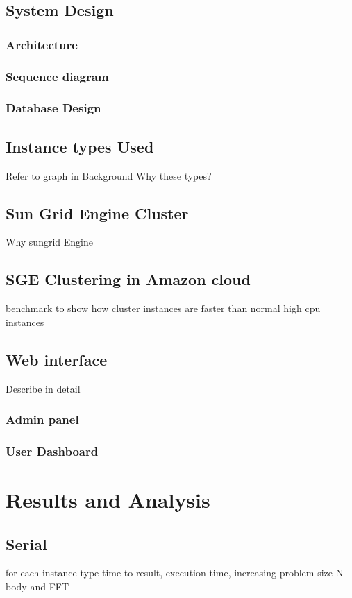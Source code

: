 \documentclass[12pt,a4paper]{report}
\begin{document}
\section{System Design}
\subsection{Architecture}
\subsection{Sequence diagram}
\subsection{Database Design}

\section{Instance types Used}
Refer to graph in Background
Why these types?
\section{Sun Grid Engine Cluster}
Why sungrid Engine
\section{SGE Clustering in Amazon cloud}
  benchmark to show how cluster instances are faster than normal high cpu instances
\section{Web interface}
Describe in detail
\subsection{Admin panel}
\subsection{User Dashboard}

\chapter{Results and Analysis}
\section{Serial}
for each instance type
time to result, execution time, increasing problem size
N-body and FFT
\end{document}
